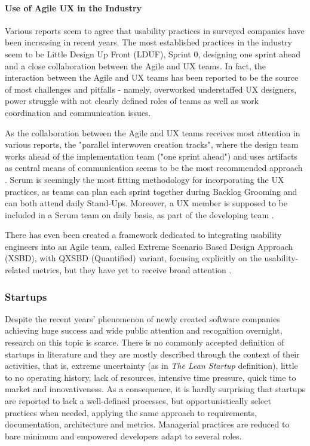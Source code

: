 \documentclass{article}
\begin{document}
\paragraph{Use of Agile UX in the Industry}
Various reports seem to agree that usability practices in surveyed companies have been increasing in recent years. The most established practices in the industry seem to be Little Design Up Front (LDUF), Sprint 0, designing one sprint ahead and a close collaboration between the Agile and UX teams. In fact, the interaction between the Agile and UX teams has been reported to be the source of most challenges and pitfalls - namely, overworked understaffed UX designers, power struggle with not clearly defined roles of teams as well as work coordination and communication issues. \citep{salah2014systematic}\citep{jurca2014integrating}

As the collaboration between the Agile and UX teams receives most attention in various reports, the "parallel interwoven creation tracks", where the design team works ahead of the implementation team ("one sprint ahead") and uses artifacts as central means of communication seems to be the most recommended approach \citep{brhel2015exploring}. Scrum is seemingly the most fitting methodology for incorporating the UX practices, as teams can plan each sprint together during Backlog Grooming and can both attend daily Stand-Ups. Moreover, a UX member is supposed to be included in a Scrum team on daily basis, as part of the developing team \citep{ovad2015prevalence}.

There has even been created a framework dedicated to integrating usability engineers into an Agile team, called Extreme Scenario Based Design Approach (XSBD), with QXSBD (Quantified) variant, focusing explicitly on the usability-related metrics, but they have yet to receive broad attention \citep{jurca2014integrating}.

\subsubsection{Startups}
Despite the recent years' phenomenon of newly created software companies achieving huge success and wide public attention and recognition overnight, research on this topic is scarce. There is no commonly accepted definition of startups in literature and they are mostly described through the context of their activities, that is, extreme uncertainty (as in \textit{The Lean Startup} \citep{ries2011lean} definition), little to no operating history, lack of resources, intensive time pressure, quick time to market and innovativeness. As a consequence, it is hardly surprising that startups are reported to lack a well-defined processes, but opportunistically select practices when needed, applying the same approach to requirements, documentation, architecture and metrics. Managerial practices are reduced to bare minimum and empowered developers adapt to several roles. \citep{paternoster2014software}
\end{document}
